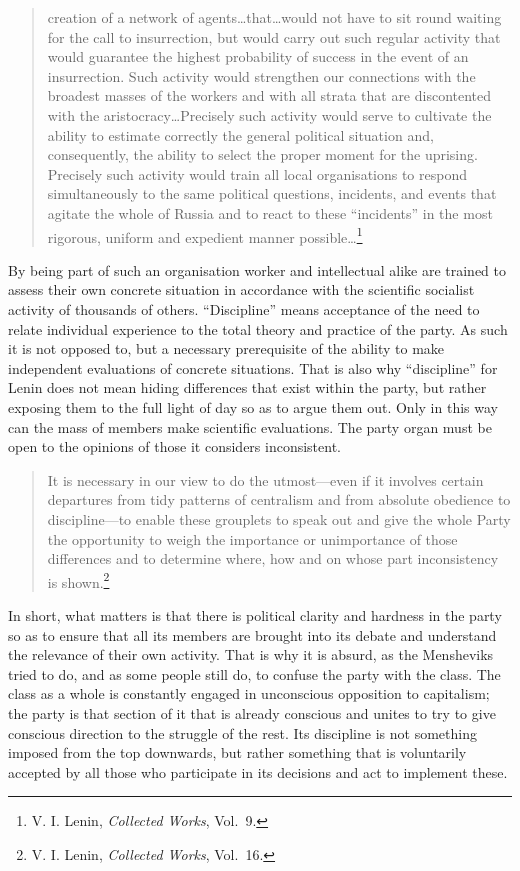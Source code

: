 \blockquote{creation of a network of agents\ldots that\ldots would not have to sit round waiting for the call to insurrection, but would carry out such regular activity that would guarantee the highest probability of success in the event of an insurrection. Such activity would strengthen our connections with the broadest masses of the workers and with all strata that are discontented with the aristocracy\ldots Precisely such activity would serve to cultivate the ability to estimate correctly the general political situation and, consequently, the ability to select the proper moment for the uprising. Precisely such activity would train all local organisations to respond simultaneously to the same political questions, incidents, and events that agitate the whole of Russia and to react to these ``incidents'' in the most rigorous, uniform and expedient manner possible\ldots\footnote{V. I. Lenin, \emph{Collected Works}, Vol.~9.}}

By being part of such an organisation worker and intellectual alike are trained to assess their own concrete situation in accordance with the scientific socialist activity of thousands of others. ``Discipline'' means acceptance of the need to relate individual experience to the total theory and practice of the party. As such it is not opposed to, but a necessary prerequisite of the ability to make independent evaluations of concrete situations. That is also why ``discipline'' for Lenin does not mean hiding differences that exist within the party, but rather exposing them to the full light of day so as to argue them out. Only in this way can the mass of members make scientific evaluations. The party organ must be open to the opinions of those it considers inconsistent.

\blockquote{It is necessary in our view to do the utmost---even if it involves certain departures from tidy patterns of centralism and from absolute obedience to discipline---to enable these grouplets to speak out and give the whole Party the opportunity to weigh the importance or unimportance of those differences and to determine where, how and on whose part inconsistency is shown.\footnote{V. I. Lenin, \emph{Collected Works}, Vol.~16.}}

In short, what matters is that there is political clarity and hardness in the party so as to ensure that all its members are brought into its debate and understand the relevance of their own activity. That is why it is absurd, as the Mensheviks tried to do, and as some people still do, to confuse the party with the class. The class as a whole is constantly engaged in unconscious opposition to capitalism; the party is that section of it that is already conscious and unites to try to give conscious direction to the struggle of the rest. Its discipline is not something imposed from the top downwards, but rather something that is voluntarily accepted by all those who participate in its decisions and act to implement these.

